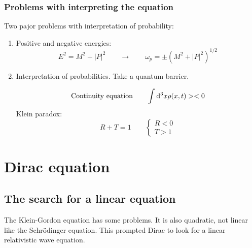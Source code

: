 \subsubsection{Problems with interpreting the equation}
Two pajor problems with interpretation of probability:
\begin{enumerate}
\item Positive and negative energies:
\[ E^2 = M^2 + |P|^2 \qquad \rightarrow \qquad \omega_p = \pm \left(M^2+|P|^2\right)^{1/2}\]
\item Interpretation of probabilities. Take a quantum barrier. 

\[ \text{Continuity equation} \qquad \int \operatorname{d \!}{^3x}\rho(x,t) > < 0\]
Klein paradox:
\[ R+T =1 \qquad \begin{cases}
R<0 \\ T> 1
\end{cases} \]
\end{enumerate}


\section{Dirac equation}
\subsection{The search for a linear equation}
The Klein-Gordon equation has some problems. It is also quadratic, not linear like the Schrödinger equation. This prompted Dirac to look for a linear relativistic wave equation.

